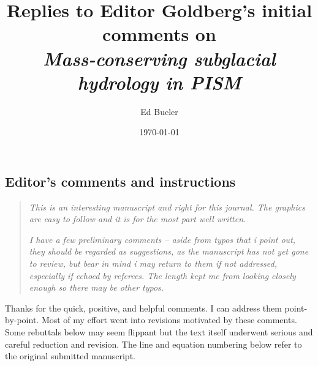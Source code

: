 \documentclass[11pt,reqno]{amsart}
\title[Replies to Editor Goldberg's comments]{Replies to Editor Goldberg's initial comments on \\ \emph{Mass-conserving subglacial hydrology in PISM}}
\author{Ed Bueler}
\date{\today}
\begin{document}
\maketitle

\thispagestyle{empty}



\subsection*{Editor's comments and instructions}  \begin{quote}
\emph{This is an interesting manuscript and right for this journal. The graphics are easy to follow and it is for the most part well written.}

\emph{I have a few preliminary comments -- aside from typos that i point out, they should be regarded as suggestions, as the manuscript has not yet gone to review, but bear in mind i may return to them if not addressed, especially if echoed by referees. The length kept me from looking closely enough so there may be other typos.}
\end{quote}

\medskip
\noindent Thanks for the quick, positive, and helpful comments.  I can address them point-by-point.  Most of my effort went into revisions motivated by these comments.  Some rebuttals below may seem flippant but the text itself underwent serious and careful reduction and revision.   The line and equation numbering below refer to the original submitted manuscript.
\end{document}
